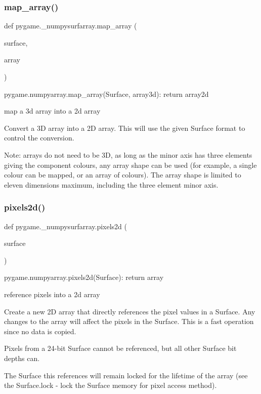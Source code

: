 \subsubsection{\texorpdfstring{map\+\_\+array()}{map\_array()}}
{\footnotesize\ttfamily def pygame.\+\_\+numpysurfarray.\+map\+\_\+array (\begin{DoxyParamCaption}\item[{}]{surface,  }\item[{}]{array }\end{DoxyParamCaption})}

\begin{DoxyVerb}pygame.numpyarray.map_array(Surface, array3d): return array2d

map a 3d array into a 2d array

Convert a 3D array into a 2D array. This will use the given Surface
format to control the conversion.

Note: arrays do not need to be 3D, as long as the minor axis has
three elements giving the component colours, any array shape can be
used (for example, a single colour can be mapped, or an array of
colours). The array shape is limited to eleven dimensions maximum,
including the three element minor axis.
\end{DoxyVerb}
 \mbox{\label{namespacepygame_1_1__numpysurfarray_aa05d0ce24145776b0f0c87acbad2d1ff}} 
\subsubsection{\texorpdfstring{pixels2d()}{pixels2d()}}
{\footnotesize\ttfamily def pygame.\+\_\+numpysurfarray.\+pixels2d (\begin{DoxyParamCaption}\item[{}]{surface }\end{DoxyParamCaption})}

\begin{DoxyVerb}pygame.numpyarray.pixels2d(Surface): return array

reference pixels into a 2d array

Create a new 2D array that directly references the pixel values in a
Surface. Any changes to the array will affect the pixels in the
Surface. This is a fast operation since no data is copied.

Pixels from a 24-bit Surface cannot be referenced, but all other
Surface bit depths can.

The Surface this references will remain locked for the lifetime of
the array (see the Surface.lock - lock the Surface memory for pixel
access method).
\end{DoxyVerb}
 \mbox{\label{namespacepygame_1_1__numpysurfarray_a317e54caca003290ff9e312bc9500b2a}} 
